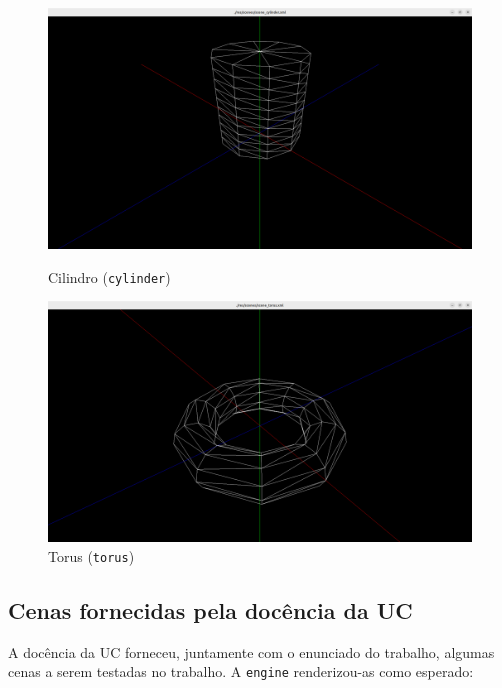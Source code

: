 \documentclass[12pt, a4paper]{article}
\begin{document}
\begin{figure}[H]
    \centering
    \begin{minipage}{0.48\textwidth}
        \centering
        \includegraphics[width=\textwidth]{res/phase1/results/Cylinder.png}
        \caption{Cilindro (\texttt{cylinder})}
    \end{minipage}
    \begin{minipage}{0.48\textwidth}
        \centering
        \includegraphics[width=\textwidth]{res/phase1/results/Torus.png}
        \caption{Torus (\texttt{torus})}
    \end{minipage}
\end{figure}

\subsection{Cenas fornecidas pela docência da UC}

A docência da UC forneceu, juntamente com o enunciado do trabalho, algumas cenas a serem testadas no
trabalho. A \texttt{engine} renderizou-as como esperado:
\end{document}
